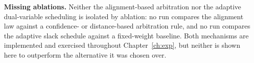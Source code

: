 \textbf{Missing ablations.} Neither the alignment-based arbitration nor the adaptive dual-variable scheduling is isolated by ablation: no run compares the alignment law against a confidence- or distance-based arbitration rule, and no run compares the adaptive slack schedule against a fixed-weight baseline. Both mechanisms are implemented and exercised throughout Chapter~\ref{ch:exp}, but neither is shown here to outperform the alternative it was chosen over.

